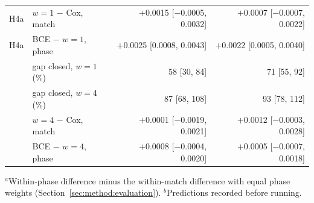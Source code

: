 \begin{table}[t]
\begin{tabular}{@{}llrr@{}}
H4a & $w{=}1$ $-$ Cox, match & $+$0.0015 {\scriptsize[$-$0.0005, 0.0032]} & $+$0.0007 {\scriptsize[$-$0.0007, 0.0022]} \\
H4a & BCE $-$ $w{=}1$, phase & $+$0.0025 {\scriptsize[0.0008, 0.0043]} & $+$0.0022 {\scriptsize[0.0005, 0.0040]} \\
 & gap closed, $w{=}1$ (\%) & 58 {\scriptsize[30, 84]} & 71 {\scriptsize[55, 92]} \\
 & gap closed, $w{=}4$ (\%) & 87 {\scriptsize[68, 108]} & 93 {\scriptsize[78, 112]} \\
 & $w{=}4$ $-$ Cox, match & $+$0.0001 {\scriptsize[$-$0.0019, 0.0021]} & $+$0.0012 {\scriptsize[$-$0.0003, 0.0028]} \\
 & BCE $-$ $w{=}4$, phase & $+$0.0008 {\scriptsize[$-$0.0004, 0.0020]} & $+$0.0005 {\scriptsize[$-$0.0007, 0.0018]} \\
\bottomrule
\end{tabular}
\smallskip
\parbox{\columnwidth}{\scriptsize $^{a}$Within-phase difference minus the within-match difference with equal phase weights (Section~\ref{sec:method:evaluation}). $^{b}$Predictions recorded before running.}
\end{table}
